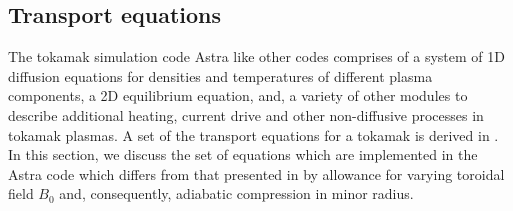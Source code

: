 \subsection{Transport equations}

The tokamak simulation code Astra like other codes comprises of a
system of 1D diffusion equations for densities and temperatures of
different plasma components, a 2D equilibrium equation, and, 
a variety of other modules to describe additional heating, current
drive and other non-diffusive processes in tokamak plasmas. A set of the
transport equations for a tokamak is derived in \cite{HH}. In this
section, we discuss the set of equations which are  implemented in the
Astra code which differs from that presented in \cite{HH} by allowance
for varying toroidal field $B_0$ and, consequently, adiabatic
compression in minor radius.  

